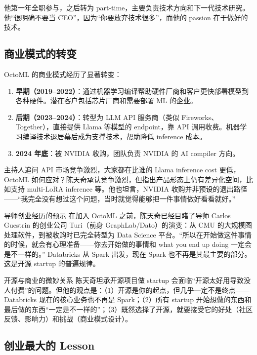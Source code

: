 \documentclass[a4paper]{article}
\begin{document}
他第一年全职参与，之后转为 part-time，主要负责技术方向和下一代技术研究。他``很明确不要当 CEO''，因为``你要放弃技术很多''，而他的 passion 在于做好的技术。

\subsection{商业模式的转变}

OctoML 的商业模式经历了显著转变：

\begin{enumerate}
    \item \textbf{早期（2019--2022）}：通过机器学习编译帮助硬件厂商和客户更快部署模型到各种硬件。潜在客户包括芯片厂商和需要部署 ML 的企业。
    \item \textbf{后期（2023--2024）}：转型为 LLM API 服务商（类似 Fireworks、Together），直接提供 Llama 等模型的 endpoint，靠 API 调用收费。机器学习编译技术退居幕后成为支撑技术，帮助降低 inference 成本。
    \item \textbf{2024 年底}：被 NVIDIA 收购，团队负责 NVIDIA 的 AI compiler 方向。
\end{enumerate}

主持人追问 API 市场竞争激烈，大家都在比谁的 Llama inference cost 更低，OctoML 如何应对？陈天奇承认竞争激烈，但指出产品形态上仍有差异化空间，比如支持 multi-LoRA inference 等。他也坦言，NVIDIA 收购并非预设的退出路径------``我完全没有想过这个问题，当时就觉得能够把一件事情做好看看就好。''

\begin{knowledgebox}{导师创业经历的预示}
在加入 OctoML 之前，陈天奇已经目睹了导师 Carlos Guestrin 的创业公司 Turi（前身 GraphLab/Dato）的演变：从 CMU 的大规模图处理软件，到被收购时已完全转型为 Data Science 平台。``所以在开始做这件事情的时候，就会有心理准备------你去开始做的事情和 what you end up doing 一定会是不一样的。'' Databricks 从 Spark 出发，现在 Spark 也不再是其最主要的部分。这是开源 startup 的普遍规律。
\end{knowledgebox}

\begin{warningbox}{开源与商业的微妙关系}
陈天奇坦承开源项目做 startup 会面临``开源太好用导致没人付费''的问题。但他的观点是：（1）开源是你的起点，但几乎一定不是终点------Databricks 现在的核心业务也不再是 Spark；（2）所有 startup 开始想做的东西和最后做的东西``一定是不一样的''；（3）既然选择了开源，就要接受它的好处（社区反馈、影响力）和挑战（商业模式设计）。
\end{warningbox}

\subsection{创业最大的 Lesson}
\end{document}
